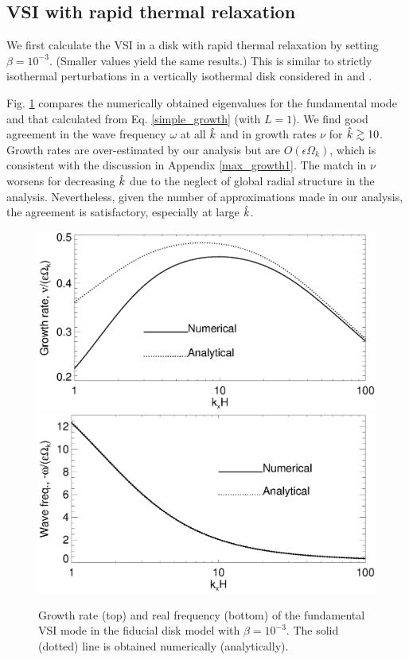 \subsection{VSI with rapid thermal relaxation}\label{vertiso_pertiso} 
We first calculate the VSI in a disk with rapid thermal relaxation by
setting $\beta=10^{-3}$. (Smaller values yield the same results.) This
is similar to strictly isothermal perturbations in a vertically
isothermal disk considered in \cite{nelson13} and \cite{mcnally14}. 

Fig. \ref{iso_eigen_kx} compares the numerically obtained eigenvalues 
for the fundamental mode and that calculated from 
Eq. \ref{simple_growth} (with $L=1$). We find good agreement in the
wave frequency $\omega$ at all $\hat{k}$ and in growth rates $\nu$ for
$\hat{k}\gtrsim 10$. Growth rates are over-estimated by our analysis but 
are $O(\epsilon\Omega_k)$, which is consistent with the discussion in
Appendix \ref{max_growth1}. The match in $\nu$ worsens for
decreasing $\hat{k}$ due to the neglect of global radial structure in
the analysis. Nevertheless, given the number of approximations made
in our analysis, the agreement is satisfactory, especially at large
$\hat{k}$.    

\begin{figure}
  \includegraphics[width=\linewidth,clip=true,trim=0cm 1.75cm 0cm
  0cm]{figures/compare_eigen_imag_iso} 
  \includegraphics[width=\linewidth,clip=true,trim=0cm 0cm 0cm
  1cm]{figures/compare_eigen_real_iso}
  \caption{Growth rate (top) and real frequency (bottom) of the
    fundamental VSI mode in the fiducial disk model with $\beta =
    10^{-3}$. 
    The solid (dotted) line is obtained numerically
    (analytically).  
    \label{iso_eigen_kx} 
  }
\end{figure}

